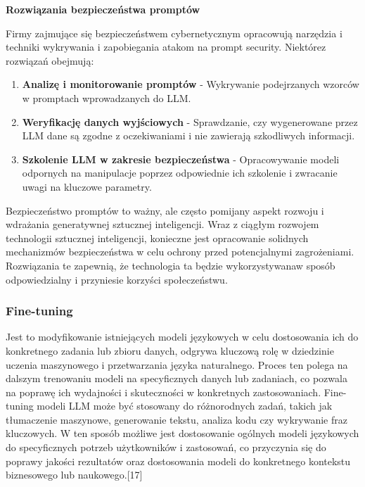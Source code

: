 {\bf Rozwiązania bezpieczeństwa promptów}

\noindent Firmy zajmujące się bezpieczeństwem cybernetycznym opracowują narzędzia i techniki wykrywania i zapobiegania atakom na prompt security. Niektóre\linebreak z rozwiązań obejmują:

\begin{enumerate}
\item {\bf Analizę i monitorowanie promptów} - Wykrywanie podejrzanych wzorców w promptach wprowadzanych do LLM.
\item {\bf Weryfikację danych wyjściowych} - Sprawdzanie, czy wygenerowane przez LLM dane są zgodne z oczekiwaniami i nie zawierają szkodliwych informacji.
\item {\bf Szkolenie LLM w zakresie bezpieczeństwa} - Opracowywanie modeli odpornych na manipulacje poprzez odpowiednie ich szkolenie i zwracanie uwagi na kluczowe parametry.
\end{enumerate}


\noindent Bezpieczeństwo promptów to ważny, ale często pomijany aspekt rozwoju i wdrażania generatywnej sztucznej inteligencji. Wraz z ciągłym rozwojem technologii sztucznej inteligencji, konieczne jest opracowanie solidnych mechanizmów bezpieczeństwa w celu ochrony przed potencjalnymi zagrożeniami. Rozwiązania te zapewnią, że technologia ta będzie wykorzystywana\linebreak w sposób odpowiedzialny i przyniesie korzyści społeczeństwu.

\subsubsection{Fine-tuning}
Jest to modyfikowanie istniejących modeli językowych w celu dostosowania ich do konkretnego zadania lub zbioru danych, odgrywa kluczową rolę w dziedzinie uczenia maszynowego i przetwarzania języka naturalnego. Proces ten polega na dalszym trenowaniu modeli na specyficznych danych lub zadaniach, co pozwala na poprawę ich wydajności i skuteczności w konkretnych zastosowaniach. Fine-tuning modeli LLM może być stosowany do różnorodnych zadań, takich jak tłumaczenie maszynowe, generowanie tekstu, analiza kodu czy wykrywanie fraz kluczowych. W ten sposób możliwe jest dostosowanie ogólnych modeli językowych do specyficznych potrzeb użytkowników i zastosowań, co przyczynia się do poprawy jakości rezultatów oraz dostosowania modeli do konkretnego kontekstu biznesowego lub naukowego.[17]


